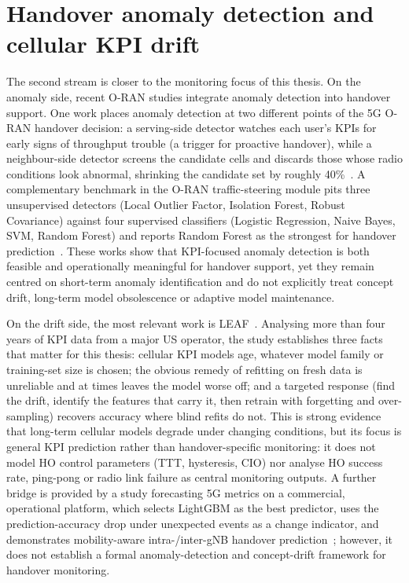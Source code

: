 \section{Handover anomaly detection and cellular KPI drift}
\label{subsec:rw-anomaly-drift}

The second stream is closer to the monitoring focus of this thesis. On the
anomaly side, recent O-RAN studies integrate anomaly detection into handover
support. One work places anomaly detection at two different points of the 5G
O-RAN handover decision: a serving-side detector watches each user's KPIs for
early signs of throughput trouble (a trigger for proactive handover), while a
neighbour-side detector screens the candidate cells and discards those whose
radio conditions look abnormal, shrinking the candidate set by roughly
40\%~\cite{oranAnomaly2025}. A complementary benchmark in the O-RAN
traffic-steering module pits three unsupervised detectors (Local Outlier
Factor, Isolation Forest, Robust Covariance) against four supervised
classifiers (Logistic Regression, Naive Bayes, SVM, Random Forest) and reports
Random Forest as the strongest for handover prediction~\cite{oranBenchmark2023}. These works show that KPI-focused
anomaly detection is both feasible and operationally meaningful for handover
support, yet they remain centred on short-term anomaly identification and do not
explicitly treat concept drift, long-term model obsolescence or adaptive model
maintenance.

On the drift side, the most relevant work is LEAF~\cite{leaf}. Analysing more
than four years of KPI data from a major US operator, the study establishes
three facts that matter for this thesis: cellular KPI models age, whatever
model family or training-set size is chosen; the obvious remedy of refitting on
fresh data is unreliable and at times leaves the model worse off; and a
targeted response (find the drift, identify the features that carry it, then
retrain with forgetting and over-sampling) recovers accuracy where blind
refits do not. This is strong
evidence that long-term cellular models degrade under changing conditions, but
its focus is general KPI prediction rather than handover-specific monitoring: it
does not model HO control parameters (TTT, hysteresis, CIO) nor analyse HO
success rate, ping-pong or radio link failure as central monitoring outputs. A
further bridge is provided by a study forecasting 5G metrics on a commercial,
operational platform, which selects LightGBM as the best predictor, uses the
prediction-accuracy drop under unexpected events as a change indicator, and
demonstrates mobility-aware intra-/inter-gNB handover prediction~\cite{forecast5g2024};
however, it does not establish a formal anomaly-detection and concept-drift
framework for handover monitoring.

